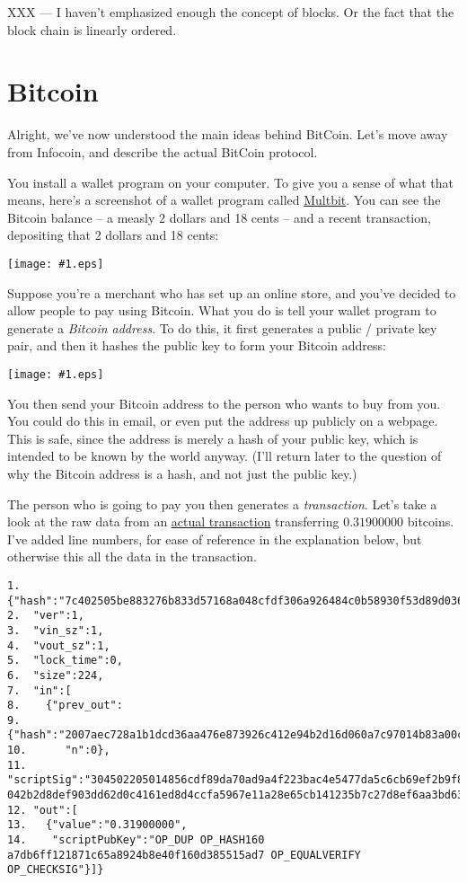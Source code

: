\documentclass[12pt]{book}
\newcommand{\img}[2]{\begin{center}\texttt{[image: \#1.eps]}\end{center}}
\newcommand{\link}[2]{\href{#1}{#2}}
\begin{document}
XXX --- I haven't emphasized enough the concept of blocks.  Or the
fact that the block chain is linearly ordered.

\section{Bitcoin}

Alright, we've now understood the main ideas behind BitCoin.  Let's
move away from Infocoin, and describe the actual BitCoin protocol.

You install a wallet program on your computer.  To give you a sense of
what that means, here's a screenshot of a wallet program called
\link{https://multibit.org/}{Multbit}.  You can see the Bitcoin
balance -- a measly 2 dollars and 18 cents -- and a recent
transaction, depositing that 2 dollars and 18 cents:
% 
\img{images/wallet_transaction}{400px}
%
Suppose you're a merchant who has set up an online store, and you've
decided to allow people to pay using Bitcoin.  What you do is tell
your wallet program to generate a \emph{Bitcoin address}.  To do this,
it first generates a public / private key pair, and then it hashes the
public key to form your Bitcoin address:
%
\img{images/bitcoin_address}{400px}
%
You then send your Bitcoin address to the person who wants to buy from
you.  You could do this in email, or even put the address up publicly
on a webpage.  This is safe, since the address is merely a hash of
your public key, which is intended to be known by the world anyway.
(I'll return later to the question of why the Bitcoin address is a
hash, and not just the public key.)

The person who is going to pay you then generates a
\emph{transaction}.  Let's take a look at the raw data from an
\link{http://blockexplorer.com/tx/7c402505be883276b833d57168a048cfdf306a926484c0b58930f53d89d036f9}{actual
  transaction} transferring $0.31900000$ bitcoins.  I've added line
numbers, for ease of reference in the explanation below, but otherwise
this all the data in the transaction.
\begin{Verbatim}[fontsize=\small]
1.  {"hash":"7c402505be883276b833d57168a048cfdf306a926484c0b58930f53d89d036f9",
2.  "ver":1,
3.  "vin_sz":1,
4.  "vout_sz":1,
5.  "lock_time":0,
6.  "size":224,
7.  "in":[
8.    {"prev_out":
9.      {"hash":"2007aec728a1b1dcd36aa476e873926c412e94b2d16d060a7c97014b83a00c3e",
10.      "n":0},
11.    "scriptSig":"304502205014856cdf89da70ad9a4f223bac4e5477da5c6cb69ef2b9f8b5f8548e21307e0221009bfe2698f1eb1c561f41981d8e78c11d9e685a70e682f144ee6c8ab5ecb0497c01 042b2d8def903dd62d0c4161ed8d4ccfa5967e11a28e65cb141235b7c27d8ef6aa3bd63be077323cf3d7e0e8895b264b94feb4b40478b431da6f45dfc8e1004f62"}],
12. "out":[
13.   {"value":"0.31900000",
14.    "scriptPubKey":"OP_DUP OP_HASH160 a7db6ff121871c65a8924b8e40f160d385515ad7 OP_EQUALVERIFY OP_CHECKSIG"}]}
\end{Verbatim}
\end{document}
